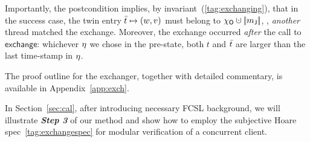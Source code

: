 Importantly, the postcondition implies, by
invariant~(\ref{tag:exchanging}), that in the success case, the twin
entry $\bar{t} \mapsto (w, v)$ must belong to $\histo \hunion
\mygather{\pending}$, \ie, \emph{another} thread matched the exchange.
Moreover, the exchange occurred \emph{after} the call to
$\mathsf{exchange}$: whichever $\eta$ we chose in the pre-state, both
$t$ and $\bar{t}$ are larger than the last time-stamp in $\eta$.

The proof outline for the exchanger, together with detailed
commentary, is available in Appendix~\ref{app:exch}.

In Section~\ref{sec:cal}, after introducing necessary FCSL background,
we will illustrate \textbf{\emph{Step 3}} of our method and show how
to employ the subjective Hoare spec~\eqref{tag:exchangespec} for
modular verification of a concurrent client.


